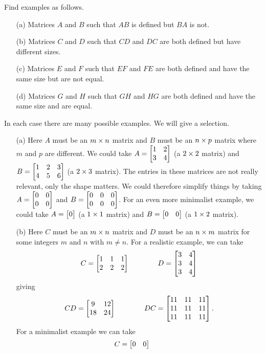 \documentclass[a4paper]{amsart}
\renewenvironment{solution}{\SolutionInline}{\endSolutionInline}
\begin{document}
\begin{exercise}\label{ex-mat-prod-eg-i}
 Find examples as follows.
 \begin{itemize}
  \item[(a)] Matrices $A$ and $B$ such that $AB$ is defined but $BA$
   is not.
  \item[(b)] Matrices $C$ and $D$ such that $CD$ and $DC$ are both
   defined but have different sizes.
  \item[(c)] Matrices $E$ and $F$ such that $EF$ and $FE$ are both
   defined and have the same size but are not equal.
  \item[(d)] Matrices $G$ and $H$ such that $GH$ and $HG$ are both
   defined and have the same size and are equal.
 \end{itemize}
\end{exercise}
\begin{solution}
 In each case there are many possible examples.  We will give a
 selection.
 \begin{itemize}
  \item[(a)] Here $A$ must be an $m\times n$ matrix and $B$ must be an
   $n\times p$ matrix where $m$ and $p$ are different.  We could take
   $A=\left[\begin{matrix} 1&2\\3&4\end{matrix}\right]$ (a $2\times 2$ matrix) and $B=\left[\begin{matrix}
   1&2&3\\4&5&6\end{matrix}\right]$ (a $2\times 3$ matrix).  The entries in these
   matrices are not really relevant, only the shape matters.  We could
   therefore simplify things by taking $A=\left[\begin{matrix} 0&0\\0&0\end{matrix}\right]$ and
   $B=\left[\begin{matrix} 0&0&0\\0&0&0\end{matrix}\right]$.  For an even more minimalist example, we
   could take $A=\left[\begin{matrix} 0 \end{matrix}\right]$ (a $1\times 1$ matrix) and $B=\left[\begin{matrix} 0&0\end{matrix}\right]$
   (a $1\times 2$ matrix).
  \item[(b)] Here $C$ must be an $m\times n$ matrix and $D$ must be an
   $n\times m$ matrix for some integers $m$ and $n$ with $m\neq n$.
   For a realistic example, we can take
   \[ C=\left[\begin{matrix} 1&1&1\\2&2&2\end{matrix}\right] \hspace{4em}
      D=\left[\begin{matrix} 3&4\\3&4\\3&4\end{matrix}\right]
   \]
   giving
   \[ CD = \left[\begin{matrix} 9 & 12 \\ 18 & 24 \end{matrix}\right] \hspace{4em}
      DC = \left[\begin{matrix} 11&11&11 \\ 11&11&11 \\ 11&11&11 \end{matrix}\right].
   \]
   For a minimalist example we can take
   \[ C = \left[\begin{matrix} 0 & 0 \end{matrix}\right] \qquad
\]
\end{itemize}
\end{solution}
\end{document}
